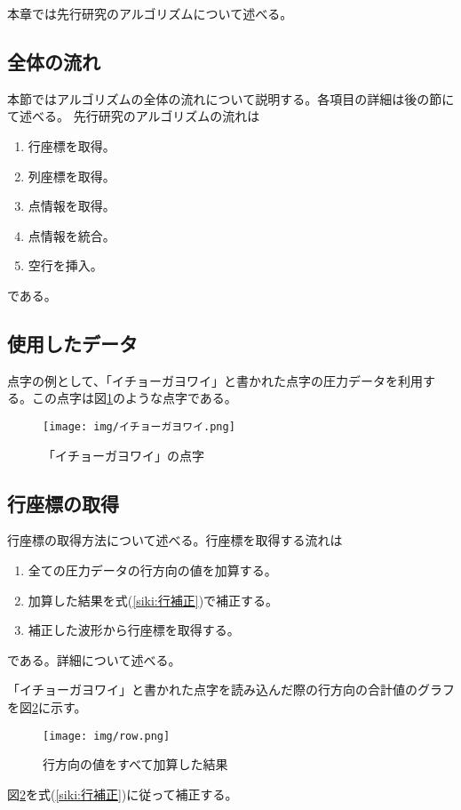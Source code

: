 本章では先行研究のアルゴリズムについて述べる。

\subsection{全体の流れ}
本節ではアルゴリズムの全体の流れについて説明する。各項目の詳細は後の節にて述べる。
先行研究のアルゴリズムの流れは
\begin{enumerate}
	\item 行座標を取得。
	\item 列座標を取得。
	\item 点情報を取得。
	\item 点情報を統合。
	\item 空行を挿入。
\end{enumerate}
である。

\subsection{使用したデータ}
点字の例として、「イチョーガヨワイ」と書かれた点字の圧力データを利用する。この点字は図\ref{f:ityo-gayowai}のような点字である。
\begin{figure}[H]
	\centering
	\texttt{[image: img/イチョーガヨワイ.png]}
	\caption{「イチョーガヨワイ」の点字}
	\label{f:ityo-gayowai}
\end{figure}

\subsection{行座標の取得}
行座標の取得方法について述べる。行座標を取得する流れは
\begin{enumerate}
	\item 全ての圧力データの行方向の値を加算する。
	\item 加算した結果を式(\ref{siki:行補正})で補正する。
	\item 補正した波形から行座標を取得する。
\end{enumerate}
である。詳細について述べる。

「イチョーガヨワイ」と書かれた点字を読み込んだ際の行方向の合計値のグラフを図\ref{f:行方向の合計}に示す。
\begin{figure}[H]
	\centering
	\texttt{[image: img/row.png]}
	\caption{行方向の値をすべて加算した結果}
	\label{f:行方向の合計}
\end{figure}
図\ref{f:行方向の合計}を式(\ref{siki:行補正})に従って補正する。


